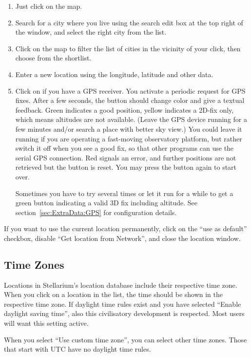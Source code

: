 \begin{enumerate}
\item Just click on the map.
\item Search for a city where you live using the search edit box at
  the top right of the window, and select the right city from the
  list.
\item Click on the map to filter the list of cities in the vicinity of
  your click, then choose from the shortlist.
\item Enter a new location using the longitude, latitude and other
  data.
\item Click on  if you have a GPS
  receiver.  You activate a periodic request
  for GPS fixes. After a few seconds, the button should change color
  and give a textual feedback. Green indicates a good position, yellow
  indicates a 2D-fix only, which means altitudes are not
  available. (Leave the GPS device running for a few minutes and/or
  search a place with better sky view.) You could leave it running if
  you are operating a fast-moving observatory platform, but rather
  switch it off when you see a good fix, so that other programs can
  use the serial GPS connection.  Red signals an error, and further
  positions are not retrieved but the button is reset. You may press
  the button again to start over.

  Sometimes you have to try several times or let it run for a while to get a
  green button indicating a valid 3D fix including altitude.
  See section~\ref{sec:ExtraData:GPS} for configuration details.
\end{enumerate}

\noindent If you want to use the current location permanently, click on the
``use as default'' checkbox, disable ``Get location from Network'',
and close the location window.

\subsection{Time Zones}
\label{sec:gui:location:timezones}
Locations in Stellarium's location database include their respective
time zone. When you click on a location in
the list, the time should be shown in the respective time zone.  If
daylight time rules exist and you have selected ``Enable daylight
saving time'', also this civilisatory development is respected. Most
users will want this setting active.

When you select ``Use custom time zone'', you can select other time zones.
Those that start with UTC have no daylight time rules.

